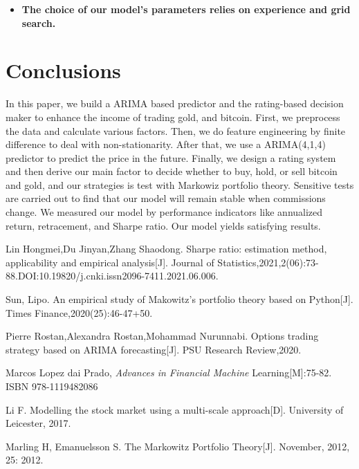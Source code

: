 \documentclass[12pt,a4paper]{article}
\newcommand{\Predictor}{ARIMA }
\begin{document}
\begin{spacing}{1.2}
\begin{itemize}
\item \textbf{The choice of our model's parameters relies on experience and grid search.}
\end{itemize}


\section{Conclusions}
\label{Conclusions}

In this paper, we build a \Predictor based predictor and the rating-based decision maker to enhance the income of trading gold, and bitcoin. First, we preprocess the data and calculate various factors. Then, we do feature engineering by finite difference to deal with non-stationarity. After that, we use a ARIMA(4,1,4) predictor to predict the price in the future. Finally, we design a rating system and then derive our main factor to decide whether to buy, hold, or sell bitcoin and gold, and our strategies is test with Markowiz portfolio theory. Sensitive tests  are carried out to find that our model will remain stable when commissions change. We measured our model by performance indicators like annualized return, retracement, and Sharpe ratio. Our model yields satisfying results.




\newpage
\begin{thebibliography}{00}


Lin Hongmei,Du Jinyan,Zhang Shaodong. Sharpe ratio: estimation method, applicability and empirical analysis[J]. Journal of Statistics,2021,2(06):73-88.DOI:10.19820/j.cnki.issn2096-7411.2021.06.006.

Sun, Lipo. An empirical study of Makowitz's portfolio theory based on Python[J]. Times Finance,2020(25):46-47+50.

Pierre Rostan,Alexandra Rostan,Mohammad Nurunnabi. Options trading strategy based on ARIMA forecasting[J]. PSU Research Review,2020.


Marcos Lopez dai Prado, \textit{Advances in Financial Machine} Learning[M]:75-82. ISBN 978-1119482086

Li F. Modelling the stock market using a multi-scale approach[D]. University of Leicester, 2017.

Marling H, Emanuelsson S. The Markowitz Portfolio Theory[J]. November, 2012, 25: 2012.



\end{thebibliography}
\end{spacing}
\end{document}
